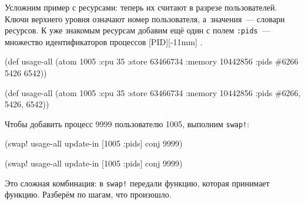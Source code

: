 
Усложним пример с ресурсами: теперь их считают в разрезе пользователей. Ключи
верхнего уровня означают номер пользователя, а~значения~--- словари ресурсов. К
уже знакомым ресурсам добавим ещё один с полем \verb|:pids|~--- множество
идентификаторов процессов [PID][-11mm]
.

\ifnarrow
\begin{english}
  \begin{clojure/lines}
(def usage-all
  (atom {1005 {:cpu 35
               :store 63466734
               :memory 10442856
               :pids #{6266 5426
                       6542}}}))
  \end{clojure/lines}
\end{english}

\else

\begin{english}
  \begin{clojure/lines}
(def usage-all
  (atom {1005 {:cpu 35
               :store 63466734
               :memory 10442856
               :pids #{6266, 5426, 6542}}}))
  \end{clojure/lines}
\end{english}
\fi

Чтобы добавить процесс 9999 пользователю 1005, выполним \verb|swap!|:

\ifnarrow

\begin{english}
  \begin{clojure}
(swap! usage-all
  update-in [1005 :pids] conj 9999)
  \end{clojure}
\end{english}

\else

\begin{english}
  \begin{clojure}
(swap! usage-all update-in [1005 :pids] conj 9999)
  \end{clojure}
\end{english}

\fi

Это сложная комбинация: в \verb|swap!| передали функцию, которая принимает
функцию. Разберём по шагам, что произошло.

